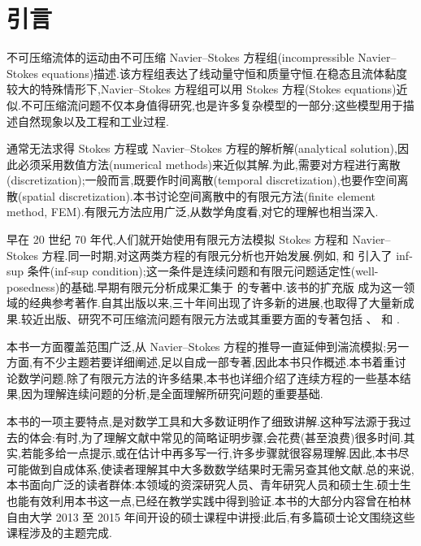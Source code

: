\chapter{引言}\label{chap:introduction}

不可压缩流体的运动由不可压缩 Navier--Stokes 方程组(incompressible Navier--Stokes equations)描述.该方程组表达了线动量守恒和质量守恒.在稳态且流体黏度较大的特殊情形下,Navier--Stokes 方程组可以用 Stokes 方程(Stokes equations)近似.不可压缩流问题不仅本身值得研究,也是许多复杂模型的一部分;这些模型用于描述自然现象以及工程和工业过程.

通常无法求得 Stokes 方程或 Navier--Stokes 方程的解析解(analytical solution),因此必须采用数值方法(numerical methods)来近似其解.为此,需要对方程进行离散(discretization);一般而言,既要作时间离散(temporal discretization),也要作空间离散(spatial discretization).本书讨论空间离散中的有限元方法(finite element method, FEM).有限元方法应用广泛,从数学角度看,对它的理解也相当深入.

早在 20 世纪 70 年代,人们就开始使用有限元方法模拟 Stokes 方程和 Navier--Stokes 方程.同一时期,对这两类方程的有限元分析也开始发展.例如,\textcite{Babuska1971} 和 \textcite{Brezzi1974} 引入了 inf-sup 条件(inf-sup condition);这一条件是连续问题和有限元问题适定性(well-posedness)的基础.早期有限元分析成果汇集于 \textcite{GiraultRaviart1979} 的专著中.该书的扩充版 \textcite{GiraultRaviart1986} 成为这一领域的经典参考著作.自其出版以来,三十年间出现了许多新的进展,也取得了大量新成果.较近出版、研究不可压缩流问题有限元方法或其重要方面的专著包括 \textcite{Layton2008}、\textcite{Boffi2008} 和 \textcite{Elman2014}.

本书一方面覆盖范围广泛,从 Navier--Stokes 方程的推导一直延伸到湍流模拟;另一方面,有不少主题若要详细阐述,足以自成一部专著,因此本书只作概述.本书着重讨论数学问题.除了有限元方法的许多结果,本书也详细介绍了连续方程的一些基本结果,因为理解连续问题的分析,是全面理解所研究问题的重要基础.

本书的一项主要特点,是对数学工具和大多数证明作了细致讲解.这种写法源于我过去的体会:有时,为了理解文献中常见的简略证明步骤,会花费(甚至浪费)很多时间.其实,若能多给一点提示,或在估计中再多写一行,许多步骤就很容易理解.因此,本书尽可能做到自成体系,使读者理解其中大多数数学结果时无需另查其他文献.总的来说,本书面向广泛的读者群体:本领域的资深研究人员、青年研究人员和硕士生.硕士生也能有效利用本书这一点,已经在教学实践中得到验证.本书的大部分内容曾在柏林自由大学 2013 至 2015 年间开设的硕士课程中讲授;此后,有多篇硕士论文围绕这些课程涉及的主题完成.

